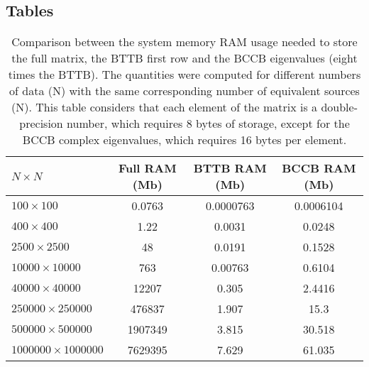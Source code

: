 \documentclass[manuscript,revised]{geophysics}
\begin{document}
\subsection{Tables}

\begin{table}[h]
	\begin{center}
		\begin{tabular}{|l|c|c|c|}
			\hline
			\textbf{$N \times N$} & \textbf{Full RAM (Mb)} & \textbf{BTTB RAM (Mb)}  & \textbf{BCCB RAM (Mb)}\\
			\hline 
			$100 \times 100$ & 0.0763 & 0.0000763 & 0.0006104\\
			\hline
			$400 \times 400$ & 1.22 & 0.0031 & 0.0248\\
			\hline
			$2500 \times 2500$ & 48 & 0.0191 & 0.1528\\
			\hline
			$10000 \times 10000$ & 763 & 0.00763 & 0.6104\\
			\hline
			$40000 \times 40000$ & 12207 & 0.305 & 2.4416 \\
			\hline
			$250000 \times 250000$ & 476837 & 1.907 & 15.3 \\
			\hline
			$500000 \times 500000$ & 1907349 & 3.815 & 30.518 \\
			\hline
			$1000000 \times 1000000$ & 7629395 & 7.629 & 61.035 \\
			\hline
		\end{tabular}
		\caption{Comparison between the system memory RAM usage needed to store the full matrix, the BTTB first row and the BCCB eigenvalues (eight times the BTTB). The quantities were computed for different numbers of data (N) with the same corresponding number of equivalent sources (N). This table considers that each element of the matrix is a double-precision number, which requires 8 bytes of storage, except for the BCCB complex eigenvalues, which requires 16 bytes per element.}
	\end{center}
\end{table} 
\end{document}
